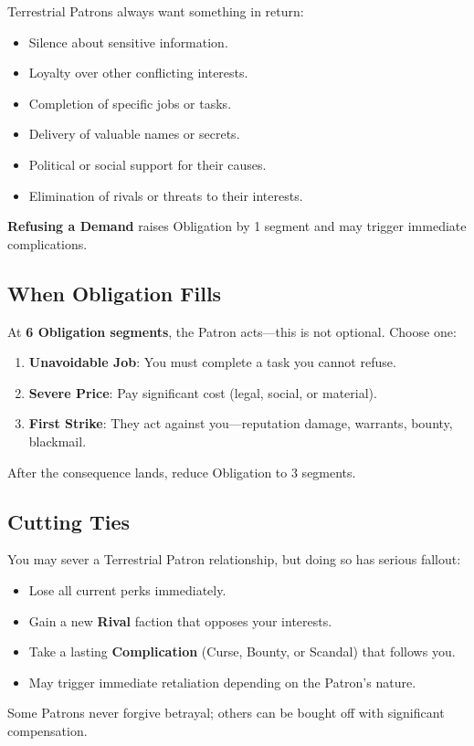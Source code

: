 Terrestrial Patrons always want something in return:
\begin{itemize}
    \item Silence about sensitive information.
    \item Loyalty over other conflicting interests.
    \item Completion of specific jobs or tasks.
    \item Delivery of valuable names or secrets.
    \item Political or social support for their causes.
    \item Elimination of rivals or threats to their interests.
\end{itemize}
\textbf{Refusing a Demand} raises Obligation by 1 segment and may trigger immediate complications.

\subsection{When Obligation Fills}
\label{sec:terrestrial-obligation-fill}

At \textbf{6 Obligation segments}, the Patron acts---this is not optional. Choose one:
\begin{enumerate}
    \item \textbf{Unavoidable Job}: You must complete a task you cannot refuse.
    \item \textbf{Severe Price}: Pay significant cost (legal, social, or material).
    \item \textbf{First Strike}: They act against you---reputation damage, warrants, bounty, blackmail.
\end{enumerate}
After the consequence lands, reduce Obligation to 3 segments.

\subsection{Cutting Ties}
\label{sec:terrestrial-cutting-ties}

You may sever a Terrestrial Patron relationship, but doing so has serious fallout:
\begin{itemize}
    \item Lose all current perks immediately.
    \item Gain a new \textbf{Rival} faction that opposes your interests.
    \item Take a lasting \textbf{Complication} (Curse, Bounty, or Scandal) that follows you.
    \item May trigger immediate retaliation depending on the Patron's nature.
\end{itemize}
Some Patrons never forgive betrayal; others can be bought off with significant compensation.

